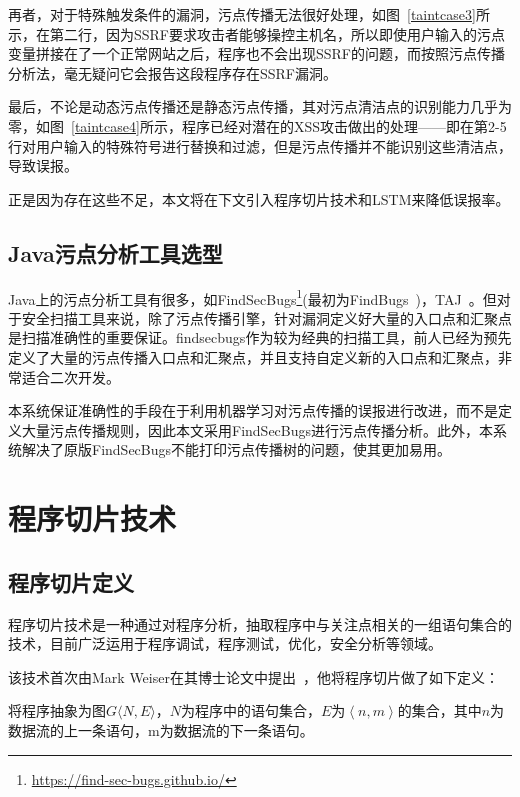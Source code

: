 再者，对于特殊触发条件的漏洞，污点传播无法很好处理，如图~\ref{taintcase3}所示，在第二行，因为SSRF要求攻击者能够操控主机名，所以即使用户输入的污点变量拼接在了一个正常网站之后，程序也不会出现SSRF的问题，而按照污点传播分析法，毫无疑问它会报告这段程序存在SSRF漏洞。

最后，不论是动态污点传播还是静态污点传播，其对污点清洁点的识别能力几乎为零，如图~\ref{taintcase4}所示，程序已经对潜在的XSS攻击做出的处理——即在第2-5行对用户输入的特殊符号进行替换和过滤，但是污点传播并不能识别这些清洁点，导致误报。    

正是因为存在这些不足，本文将在下文引入程序切片技术和LSTM来降低误报率。\\

\subsection{Java污点分析工具选型}
Java上的污点分析工具有很多，如FindSecBugs\footnote{\url{https://find-sec-bugs.github.io/}}(最初为FindBugs~\cite{taint:finding})，TAJ~\cite{taint:taj}。但对于安全扫描工具来说，除了污点传播引擎，针对漏洞定义好大量的入口点和汇聚点是扫描准确性的重要保证。findsecbugs作为较为经典的扫描工具，前人已经为预先定义了大量的污点传播入口点和汇聚点，并且支持自定义新的入口点和汇聚点，非常适合二次开发。

本系统保证准确性的手段在于利用机器学习对污点传播的误报进行改进，而不是定义大量污点传播规则，因此本文采用FindSecBugs进行污点传播分析。此外，本系统解决了原版FindSecBugs不能打印污点传播树的问题，使其更加易用。\\

\section{程序切片技术}
\subsection{程序切片定义}
程序切片技术是一种通过对程序分析，抽取程序中与关注点相关的一组语句集合的技术，目前广泛运用于程序调试，程序测试，优化，安全分析等领域。

该技术首次由Mark Weiser在其博士论文中提出~\cite{slices:weiser1979}，他将程序切片做了如下定义：

将程序抽象为图$G\langle N,E\rangle$，$N$为程序中的语句集合，$E$为$\left\langle n,m \right\rangle$的集合，其中$n$为数据流的上一条语句，m为数据流的下一条语句。

